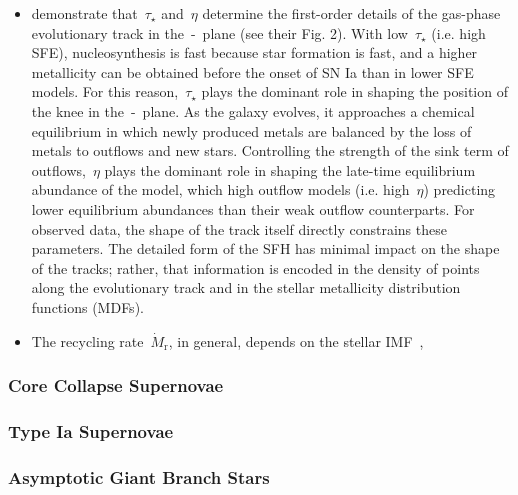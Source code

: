 \documentclass[ms.tex]{subfiles}
\begin{document}
\begin{itemize}
\begin{itemize}
		\item \citet{Weinberg2017} demonstrate that~$\tau_\star$ and~$\eta$
		determine the first-order details of the gas-phase evolutionary track
		in the~\afe-\feh~plane (see their Fig. 2).
		With low~$\tau_\star$ (i.e. high SFE), nucleosynthesis is fast because
		star formation is fast, and a higher metallicity can be obtained before
		the onset of SN Ia than in lower SFE models.
		For this reason,~$\tau_\star$ plays the dominant role in shaping the
		position of the knee in the~\afe-\feh~plane.
		As the galaxy evolves, it approaches a chemical equilibrium in which
		newly produced metals are balanced by the loss of metals to outflows
		and new stars.
		Controlling the strength of the sink term of outflows,~$\eta$ plays
		the dominant role in shaping the late-time equilibrium abundance of the
		model, which high outflow models (i.e. high~$\eta$) predicting lower
		equilibrium abundances than their weak outflow counterparts.
		For observed data, the shape of the track itself directly constrains
		these parameters.
		The detailed form of the SFH has minimal impact on the shape of the
		tracks; rather, that information is encoded in the density of points
		along the evolutionary track and in the stellar metallicity
		distribution functions (MDFs).

		\item The recycling rate~$\dot{M}_\text{r}$, in general, depends on the
		stellar IMF~\citep[e.g.][]{Salpeter1955, Miller1979, Kroupa2001,
		Chabrier2003}, 

	\end{itemize}

\end{itemize}

\subsubsection{Core Collapse Supernovae}
\label{sec:methods:onezone:ccsne}

\subsubsection{Type Ia Supernovae}
\label{sec:methods:onezone:sneia}

\subsubsection{Asymptotic Giant Branch Stars}
\label{sec:methods:onezone:agb}
\end{document}

